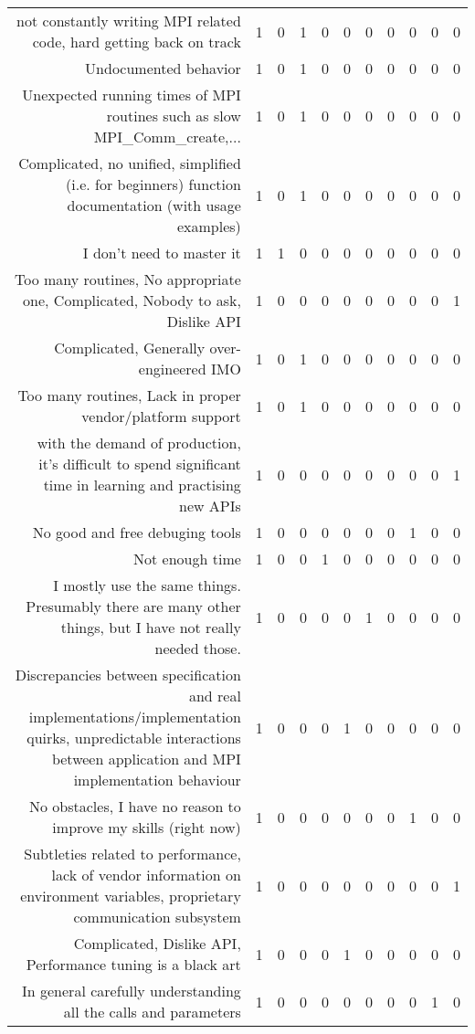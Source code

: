 {\begin{landscape}
\begin{longtable}[htb]{r|c|c|c|c|c|c|c|c|c|c}
{not constantly writing MPI related code, hard getting back on track} & 1 & 0 & 1 & 0 & 0 & 0 & 0 & 0 & 0 & 0 \\%
{Undocumented behavior} & 1 & 0 & 1 & 0 & 0 & 0 & 0 & 0 & 0 & 0 \\%
{Unexpected running times of MPI routines such as slow MPI\_Comm\_create,...} & 1 & 0 & 1 & 0 & 0 & 0 & 0 & 0 & 0 & 0 \\%
{Complicated, no unified, simplified (i.e. for beginners) function documentation (with usage examples)} & 1 & 0 & 1 & 0 & 0 & 0 & 0 & 0 & 0 & 0 \\%
{I don't need to master it} & 1 & 1 & 0 & 0 & 0 & 0 & 0 & 0 & 0 & 0 \\%
{Too many routines, No appropriate one, Complicated, Nobody to ask, Dislike API} & 1 & 0 & 0 & 0 & 0 & 0 & 0 & 0 & 0 & 1 \\%
{Complicated, Generally over-engineered IMO} & 1 & 0 & 1 & 0 & 0 & 0 & 0 & 0 & 0 & 0 \\%
{Too many routines, Lack in proper vendor/platform support} & 1 & 0 & 1 & 0 & 0 & 0 & 0 & 0 & 0 & 0 \\%
{with the demand of production, it's difficult to spend significant time in learning and practising new APIs} & 1 & 0 & 0 & 0 & 0 & 0 & 0 & 0 & 0 & 1 \\%
{No good and free debuging tools} & 1 & 0 & 0 & 0 & 0 & 0 & 0 & 1 & 0 & 0 \\%
{Not enough time} & 1 & 0 & 0 & 1 & 0 & 0 & 0 & 0 & 0 & 0 \\%
{I mostly use the same things.  Presumably there are many other things, but I have not really needed those.} & 1 & 0 & 0 & 0 & 0 & 1 & 0 & 0 & 0 & 0 \\%
{Discrepancies between specification and real implementations/implementation quirks, unpredictable interactions between application and MPI implementation behaviour} & 1 & 0 & 0 & 0 & 1 & 0 & 0 & 0 & 0 & 0 \\%
{No obstacles, I have no reason to improve my skills (right now)} & 1 & 0 & 0 & 0 & 0 & 0 & 0 & 1 & 0 & 0 \\%
{Subtleties related to performance, lack of vendor information on environment variables, proprietary communication subsystem} & 1 & 0 & 0 & 0 & 0 & 0 & 0 & 0 & 0 & 1 \\%
{Complicated, Dislike API, Performance tuning is a black art} & 1 & 0 & 0 & 0 & 1 & 0 & 0 & 0 & 0 & 0 \\%
{In general carefully understanding all the calls and parameters} & 1 & 0 & 0 & 0 & 0 & 0 & 0 & 0 & 1 & 0 \\%

\end{longtable}
\end{landscape}}
